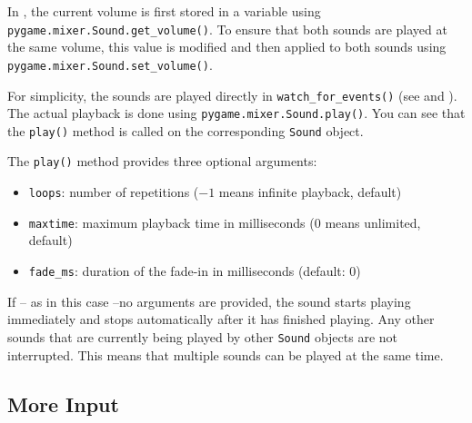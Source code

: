 
In , the current volume is first stored in a variable using
\texttt{pygame\-.mixer\-.Sound\-.get\_\-volume()}. To ensure that both sounds are played at the same volume, this value is modified and then applied to both sounds using
\texttt{pygame.mixer.Sound.set\_volume()}.

\newpage
{} 

For simplicity, the sounds are played directly in \texttt{watch\_for\_events()} (see  and ). The actual playback is done using \texttt{pygame.mixer.Sound.play()}. You can see that the \texttt{play()} method is called on the corresponding \texttt{Sound} object.

The \texttt{play()} method provides three optional arguments:
\begin{itemize}
	\item \texttt{loops}: number of repetitions ($-1$ means infinite playback, default)
	\item \texttt{maxtime}: maximum playback time in milliseconds ($0$ means unlimited, default)
	\item \texttt{fade\_ms}: duration of the fade-in in milliseconds (default: $0$)
\end{itemize}

If -- as in this case --no arguments are provided, the sound starts playing immediately and stops automatically after it has finished playing. Any other sounds that are currently being played by other \texttt{Sound} objects are not interrupted. This means that multiple sounds can be played at the same time.



\newpage
\subsection{More Input}

